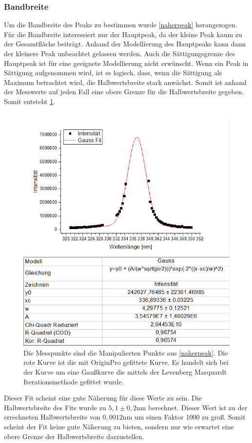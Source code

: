 \documentclass[
	a4paper,
	12pt,
	pagesize,
	ngerman
]{scrartcl}
\begin{document}
\subsubsection{Bandbreite}
Um die Bandbreite des Peaks zu bestimmen wurde \cref{naherpeak} herangezogen. Für die Bandbreite interessiert nur der Hauptpeak, da der kleine Peak kaum zu der Gesamtfläche beiträgt. Anhand der Modellierung des Hauptpeaks kann dann der kleinere Peak unbeachtet gelassen werden. Auch die Sättigungsgrenze des Hauptpeak ist für eine geeignete Modellierung nicht erwünscht. Wenn ein Peak in Sättigung aufgenommen wird, ist es logisch, dass, wenn die Sättigung als Maximum betrachtet wird, die Halbwertsbreite stark anwächst. Somit ist anhand der Messwerte auf jeden Fall eine obere Grenze für die Halbwertsbreite gegeben.
Somit entsteht \cref{bilfun}. 
\begin{figure}[h!]
	\centering
	\includegraphics[scale = 0.9]{fitsnip.png}
	\caption{Die Messpunkte sind die Manipulierten Punkte aus \cref{naherpeak}. Die rote Kurve ist die mit OriginPro gefittete Kurve. Es handelt sich bei der Kurve um eine Gaußkurve die mittels der Levenberg Marquardt Iterationsmethode gefittet wurde.}
	\label{bilfun}
\end{figure}
Dieser Fit scheint eine gute Näherung für diese Werte zu sein. Die Halbwertsbreite des Fits wurde zu $5,1 \pm 0,2$nm berechnet. Dieser Wert ist zu der errechneten Halbwertsbreite von $0,0012$nm um einen Faktor 1000 zu groß. Somit scheint der Fit keine gute Näherung zu bieten, sondern nur wie erwartet eine obere Grenze der Halbwertsbreite darzustellen.
\end{document}
